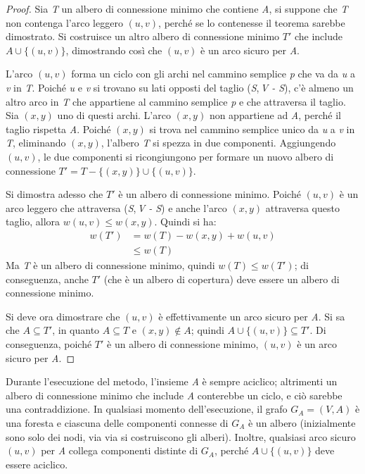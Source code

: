 \documentclass[10pt, a4paper]{report}
\begin{document}
\begin{proof}
Sia \textit{T} un albero di connessione minimo che contiene \textit{A}, si suppone che \textit{T} non contenga l'arco leggero $(u,v)$, perché se lo contenesse il teorema sarebbe dimostrato. Si costruisce un altro albero di connessione minimo $T'$ che include $A \cup \{(u,v)\}$, dimostrando così che $(u,v)$ è un arco sicuro per \textit{A}.

L'arco $(u,v)$ forma un ciclo con gli archi nel cammino semplice \textit{p} che va da \textit{u} a \textit{v} in \textit{T}. Poiché \textit{u} e \textit{v} si trovano su lati opposti del taglio (\textit{S},\,\textit{V - S}), c'è almeno un altro arco in \textit{T} che appartiene al cammino semplice \textit{p} e che attraversa il taglio. Sia $(x,y)$ uno di questi archi. L'arco $(x,y)$ non appartiene ad \textit{A}, perché il taglio rispetta \textit{A}. Poiché $(x,y)$ si trova nel cammino semplice unico da \textit{u} a \textit{v} in \textit{T}, eliminando $(x,y)$, l'albero \textit{T} si spezza in due componenti. Aggiungendo $(u,v)$, le due componenti si ricongiungono per formare un nuovo albero di connessione $T' = T - \{(x,y)\} \cup \{(u,v)\}$.

Si dimostra adesso che $T'$ è un albero di connessione minimo. Poiché $(u,v)$ è un arco leggero che attraversa (\textit{S},\,\textit{V - S}) e anche l'arco $(x,y)$ attraversa questo taglio, allora $w(u,v) \leq w(x,y)$. Quindi si ha:
\begin{align*}
w(T') &= w(T) - w(x,y) + w(u,v)\\
&\leq w(T)
\end{align*}
Ma \textit{T} è un albero di connessione minimo, quindi $w(T) \leq w(T')$; di conseguenza, anche $T'$ (che è un albero di copertura) deve essere un albero di connessione minimo.

Si deve ora dimostrare che $(u,v)$ è effettivamente un arco sicuro per \textit{A}. Si sa che $A \subseteq T'$, in quanto $A \subseteq T$ e $(x,y) \not\in A$; quindi $A \cup \{(u,v)\} \subseteq T'$. Di conseguenza, poiché $T'$  è un albero di connessione minimo, $(u,v)$ è un arco sicuro per \textit{A}.
\end{proof}
Durante l'esecuzione del metodo, l'insieme \textit{A} è sempre aciclico; altrimenti un albero di connessione minimo che include \textit{A} conterebbe un ciclo, e ciò sarebbe una contraddizione. In qualsiasi momento dell'esecuzione, il grafo $G_{A} = (V,A)$ è una foresta e ciascuna delle componenti connesse di $G_{A}$ è un albero (inizialmente sono solo dei nodi, via via si costruiscono gli alberi). Inoltre, qualsiasi arco sicuro $(u,v)$ per \textit{A} collega componenti distinte di $G_{A}$, perché $A \cup \{(u,v)\}$ deve essere aciclico.
\end{document}
